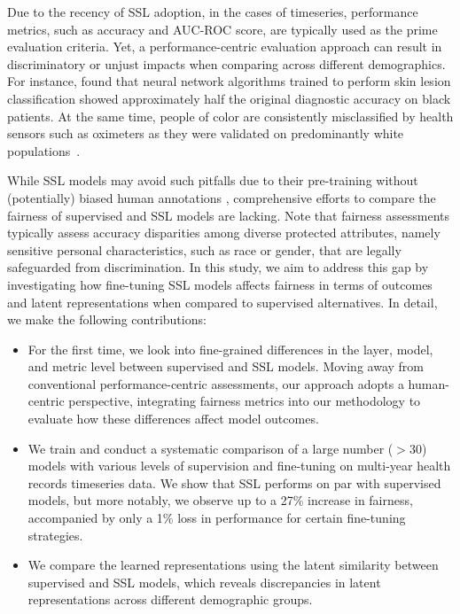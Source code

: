 \documentclass[letterpaper]{article} %
\begin{document}
Due to the recency of SSL adoption, in the cases of timeseries, performance metrics, such as accuracy and AUC-ROC score, are typically used as the prime evaluation criteria. Yet, a performance-centric evaluation approach can result in discriminatory or unjust impacts when comparing across different demographics. For instance, \citet{kamulegeya2019using} found that neural network algorithms trained to perform skin lesion classification showed approximately half the original diagnostic accuracy on black patients. At the same time, people of color are consistently misclassified by health sensors such as oximeters as they were validated on predominantly white populations~\cite{sjoding2020racial}.

While SSL models may avoid such pitfalls due to their pre-training without (potentially) biased human annotations \cite{ramapuram2021evaluating}, comprehensive efforts to compare the fairness of supervised and SSL models are lacking. Note that fairness assessments typically assess accuracy disparities among diverse protected attributes, namely sensitive personal characteristics, such as race or gender, that are legally safeguarded from discrimination. In this study, we aim to address this gap by investigating how fine-tuning SSL models affects fairness in terms of outcomes and latent representations when compared to supervised alternatives. In detail, we make the following contributions:
\begin{itemize}
    \item For the first time, we look into fine-grained differences in the layer, model, and metric level between supervised and SSL models. Moving away from conventional performance-centric assessments, our approach adopts a human-centric perspective, integrating fairness metrics into our methodology to evaluate how these differences affect model outcomes.

    \item We train and conduct a systematic comparison of a large number ($>$30) models with various levels of supervision and fine-tuning on multi-year health records timeseries data. We show that SSL performs on par with supervised models, but more notably, we observe up to a 27\% increase in fairness, accompanied by only a 1\% loss in performance for certain fine-tuning strategies.
    \item We compare the learned representations using the latent similarity between supervised and SSL models, which reveals discrepancies in latent representations across different demographic groups.
\end{itemize}
\end{document}
